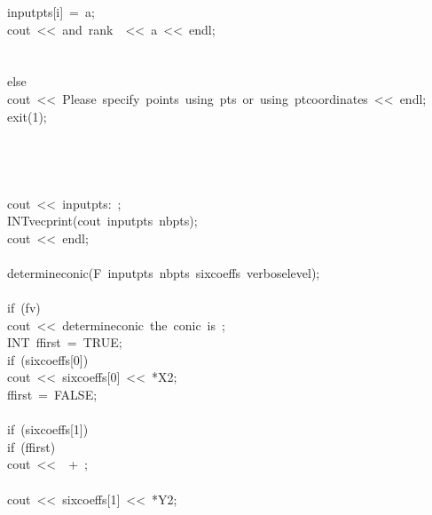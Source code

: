 \begin{tabbing}
\>\>\>inputpts[i]\ =\ a;\\[0pt]
\>\>\>cout\ <<\ and\ rank\ \ <<\ a\ <<\ endl;\\[0pt]
\>\>\>\\[0pt]
\>\>\\[0pt]
\>else\ \\[0pt]
\>\>cout\ <<\ Please\ specify\ points\ using\ pts\ or\ using\ ptcoordinates\ <<\ endl;\\[0pt]
\>\>exit(1);\\[0pt]
\>\>\\[0pt]
\\[0pt]
\\[0pt]
\\[0pt]
\>cout\ <<\ inputpts:\ ;\\[0pt]
\>INTvecprint(cout\ inputpts\ nbpts);\\[0pt]
\>cout\ <<\ endl;\\[0pt]
\\[0pt]
\>determineconic(F\ inputpts\ nbpts\ sixcoeffs\ verboselevel);\\[0pt]
\\[0pt]
\>if\ (fv)\ \\[0pt]
\>\>cout\ <<\ determineconic\ the\ conic\ is\ ;\\[0pt]
\>\>INT\ ffirst\ =\ TRUE;\\[0pt]
\>\>if\ (sixcoeffs[0])\ \\[0pt]
\>\>\>cout\ <<\ sixcoeffs[0]\ <<\ *X2;\\[0pt]
\>\>\>ffirst\ =\ FALSE;\\[0pt]
\>\>\>\\[0pt]
\>\>if\ (sixcoeffs[1])\ \\[0pt]
\>\>\>if\ (ffirst)\ \\[0pt]
\>\>\>\>cout\ <<\ \ +\ ;\\[0pt]
\>\>\>\>\\[0pt]
\>\>\>cout\ <<\ sixcoeffs[1]\ <<\ *Y2;\\[0pt]

\end{tabbing}
